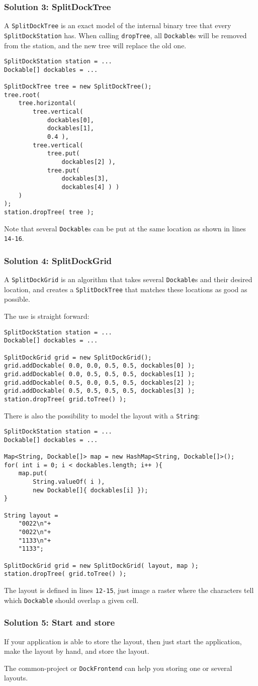 \documentclass[a4paper,10pt]{article}
\newcommand{\src}[1]{\lstinline[basicstyle=\normalsize\ttfamily,keywordstyle=\normalsize\ttfamily,identifierstyle=\normalsize\ttfamily]|#1|}
\begin{document}
\subsubsection{Solution 3: SplitDockTree}
A \src{SplitDockTree} is an exact model of the internal binary tree that every \src{SplitDockStation} has. When calling \src{dropTree}, all \src{Dockable}s will be removed from the station, and the new tree will replace the old one.
\begin{lstlisting}
SplitDockStation station = ...
Dockable[] dockables = ...

SplitDockTree tree = new SplitDockTree();
tree.root(
	tree.horizontal(
		tree.vertical( 
			dockables[0], 
			dockables[1], 
			0.4 ),
		tree.vertical(
			tree.put(
				dockables[2] ),
			tree.put(
				dockables[3],
				dockables[4] ) )
	)
);
station.dropTree( tree );
\end{lstlisting}
Note that several \src{Dockable}s can be put at the same location as shown in lines \src{14-16}.

\subsubsection{Solution 4: SplitDockGrid}
A \src{SplitDockGrid} is an algorithm that takes several \src{Dockable}s and their desired location, and creates a \src{SplitDockTree} that matches these locations as good as possible.

The use is straight forward:
\begin{lstlisting}
SplitDockStation station = ...
Dockable[] dockables = ...

SplitDockGrid grid = new SplitDockGrid();
grid.addDockable( 0.0, 0.0, 0.5, 0.5, dockables[0] );
grid.addDockable( 0.0, 0.5, 0.5, 0.5, dockables[1] );
grid.addDockable( 0.5, 0.0, 0.5, 0.5, dockables[2] );
grid.addDockable( 0.5, 0.5, 0.5, 0.5, dockables[3] );
station.dropTree( grid.toTree() );
\end{lstlisting}

There is also the possibility to model the layout with a \src{String}:
\begin{lstlisting}
SplitDockStation station = ...
Dockable[] dockables = ...

Map<String, Dockable[]> map = new HashMap<String, Dockable[]>();
for( int i = 0; i < dockables.length; i++ ){
	map.put( 
		String.valueOf( i ), 
		new Dockable[]{ dockables[i] });
}

String layout = 
	"0022\n"+
	"0022\n"+
	"1133\n"+
	"1133";

SplitDockGrid grid = new SplitDockGrid( layout, map );
station.dropTree( grid.toTree() );
\end{lstlisting}
The layout is defined in lines \src{12-15}, just image a raster where the characters tell which \src{Dockable} should overlap a given cell.

\subsubsection{Solution 5: Start and store}
If your application is able to store the layout, then just start the application, make the layout by hand, and store the layout.

The common-project or \src{DockFrontend} can help you storing one or several layouts.
\end{document}

